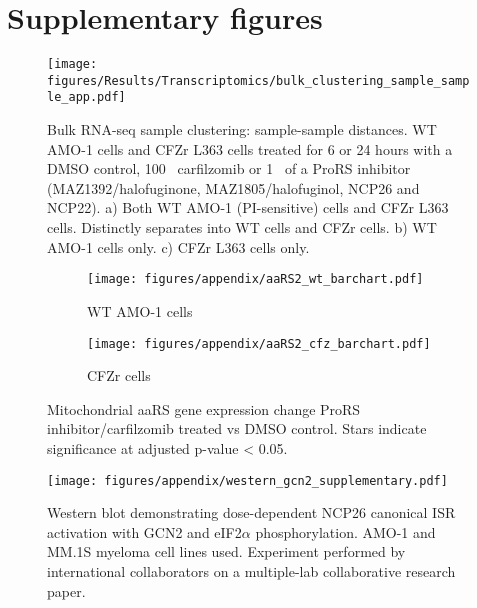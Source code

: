 \chapter{Supplementary figures}

\begin{figure}[p]
\centering
\texttt{[image: figures/Results/Transcriptomics/bulk\_clustering\_sample\_sample\_app.pdf]}
\caption[Bulk RNA-seq sample clustering-- sample-sample distances]{Bulk RNA-seq sample clustering: sample-sample distances.
WT AMO-1 cells and CFZr L363 cells treated for 6 or 24 hours with a DMSO control, 100\si{\nano\Molar} carfilzomib or 1\si{\micro\Molar} of a ProRS inhibitor (MAZ1392/halofuginone, MAZ1805/halofuginol, NCP26 and NCP22).
a) Both WT AMO-1 (PI-sensitive) cells and CFZr L363 cells.
Distinctly separates into WT cells and CFZr cells.
b) WT AMO-1 cells only.
c) CFZr L363 cells only.
}
\label{fig:clustering_bulk_sample}\end{figure}

\begin{figure}[h]
\centering
\begin{subfigure}{\textwidth}
    \texttt{[image: figures/appendix/aaRS2\_wt\_barchart.pdf]}
    \caption{WT AMO-1 cells}
\end{subfigure}
\medskip
\begin{subfigure}{\textwidth}
    \texttt{[image: figures/appendix/aaRS2\_cfz\_barchart.pdf]}
    \caption{CFZr cells}
\end{subfigure}
\caption[Bulk RNA-seq: mitochndrial aaRS gene expression change]{Mitochondrial aaRS gene expression change ProRS inhibitor/carfilzomib treated vs DMSO control.
Stars indicate significance at adjusted p-value < 0.05.}
\label{fig:ARS2_barchart}
\end{figure}

\begin{figure}[h]
\centering
\texttt{[image: figures/appendix/western\_gcn2\_supplementary.pdf]}
\caption[GCN2 and eIF2$\alpha$ western blot ]{Western blot demonstrating dose-dependent NCP26 canonical ISR activation with GCN2 and eIF2$\alpha$ phosphorylation. AMO-1 and MM.1S myeloma cell lines used.
Experiment performed by international collaborators on a multiple-lab collaborative research paper\cite{bottpreclinical2022}.
}
\label{fig:sup_western}
\end{figure}

